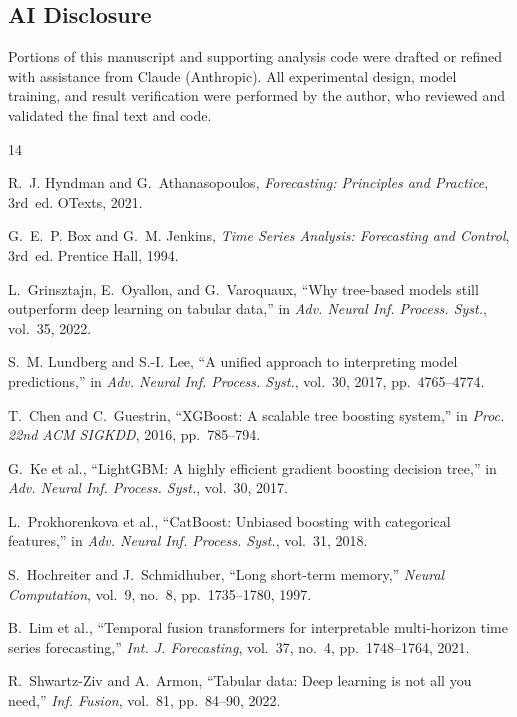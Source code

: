 \documentclass[conference]{IEEEtran}
\begin{document}
\subsection*{AI Disclosure}
Portions of this manuscript and supporting analysis code were drafted or refined with assistance from Claude (Anthropic). All experimental design, model training, and result verification were performed by the author, who reviewed and validated the final text and code.

\balance
\begin{thebibliography}{14}

R.~J. Hyndman and G.~Athanasopoulos,
\emph{Forecasting: Principles and Practice}, 3rd~ed. OTexts, 2021.

G.~E.~P. Box and G.~M. Jenkins,
\emph{Time Series Analysis: Forecasting and Control}, 3rd~ed. Prentice Hall, 1994.

L.~Grinsztajn, E.~Oyallon, and G.~Varoquaux,
``Why tree-based models still outperform deep learning on tabular data,''
in \emph{Adv. Neural Inf. Process. Syst.}, vol.~35, 2022.

S.~M. Lundberg and S.-I. Lee,
``A unified approach to interpreting model predictions,''
in \emph{Adv. Neural Inf. Process. Syst.}, vol.~30, 2017, pp.~4765--4774.

T.~Chen and C.~Guestrin,
``XGBoost: A scalable tree boosting system,''
in \emph{Proc. 22nd ACM SIGKDD}, 2016, pp.~785--794.

G.~Ke et al.,
``LightGBM: A highly efficient gradient boosting decision tree,''
in \emph{Adv. Neural Inf. Process. Syst.}, vol.~30, 2017.

L.~Prokhorenkova et al.,
``CatBoost: Unbiased boosting with categorical features,''
in \emph{Adv. Neural Inf. Process. Syst.}, vol.~31, 2018.

S.~Hochreiter and J.~Schmidhuber,
``Long short-term memory,''
\emph{Neural Computation}, vol.~9, no.~8, pp.~1735--1780, 1997.

B.~Lim et al.,
``Temporal fusion transformers for interpretable multi-horizon time series forecasting,''
\emph{Int. J. Forecasting}, vol.~37, no.~4, pp.~1748--1764, 2021.

R.~Shwartz-Ziv and A.~Armon,
``Tabular data: Deep learning is not all you need,''
\emph{Inf. Fusion}, vol.~81, pp.~84--90, 2022.


\end{thebibliography}
\end{document}
